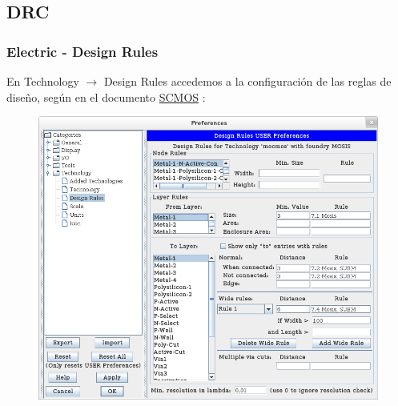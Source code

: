 \documentclass{beamer}
\begin{document}
\begin{frame}
\subsection{DRC}
\frametitle{Electric - Design Rules}
En Technology  $\rightarrow$ Design Rules accedemos a la configuración de las reglas de diseño, según en el documento \href{https://www.mosis.com/files/scmos/scmos.pdf}{SCMOS} :
\begin{figure}
\includegraphics[width=0.7\linewidth]{figuras/configuracionElectric-8.png}
\end{figure}
\end{frame}
\end{document}
